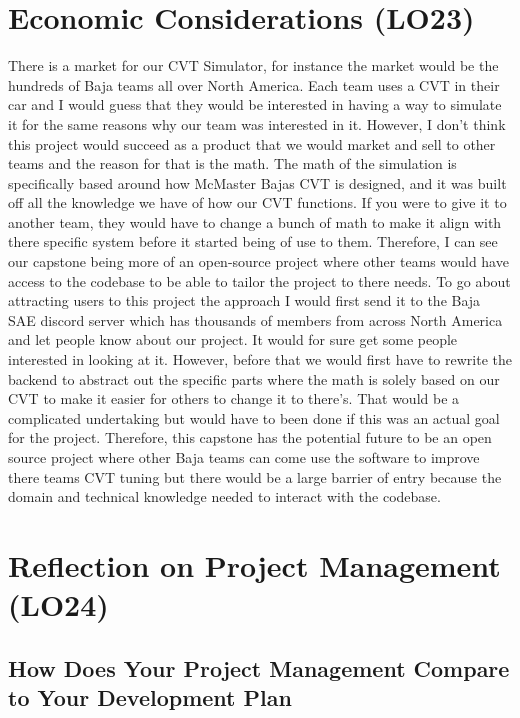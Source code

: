 \documentclass{article}
\begin{document}
\section{Economic Considerations (LO23)}

There is a market for our CVT Simulator, for instance the market would be the hundreds of Baja teams all over North America. Each team uses a CVT in their car and I would guess that they would be interested in having a way to simulate it for the same reasons why our team was interested in it. However, I don’t think this project would succeed as a product that we would market and sell to other teams and the reason for that is the math. 
The math of the simulation is specifically based around how McMaster Bajas CVT is designed, and it was built off all the knowledge we have of how our CVT functions. If you were to give it to another team, they would have to change a bunch of math to make it align with there specific system before it started being of use to them. Therefore, I can see our capstone being more of an open-source project where other teams would have access to the codebase to be able to tailor the project to there needs. 
To go about attracting users to this project the approach I would first send it to the Baja SAE discord server which has thousands of members from across North America and let people know about our project. It would for sure get some people interested in looking at it. However, before that we would first have to rewrite the backend to abstract out the specific parts where the math is solely based on our CVT to make it easier for others to change it to there’s. 
That would be a complicated undertaking but would have to been done if this was an actual goal for the project. Therefore, this capstone has the potential future to be an open source project where other Baja teams can come use the software to improve there teams CVT tuning but there would be a large barrier of entry because the domain and technical knowledge needed to interact with the codebase. 

\section{Reflection on Project Management (LO24)}


\subsection{How Does Your Project Management Compare to Your Development Plan}
\end{document}

